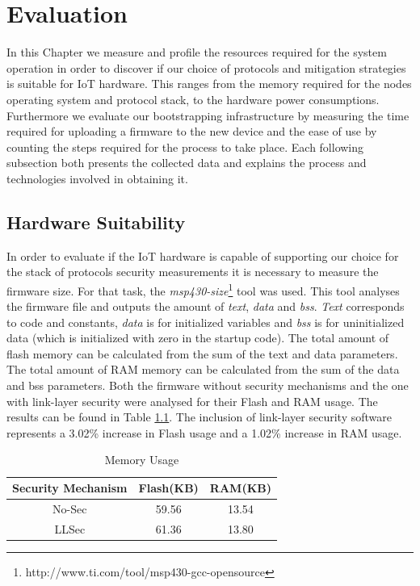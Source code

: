 
\chapter{Evaluation}
\label{chapter:evaluation}

In this Chapter we measure and profile the resources required for the system operation in order to discover if our choice of protocols and mitigation strategies is suitable for \gls{IoT} hardware. 
This ranges from the memory required for the nodes operating system and protocol stack, to the hardware power consumptions. 
Furthermore we evaluate our bootstrapping infrastructure by measuring the time required for uploading a firmware to the new device and the ease of use by counting the steps required for the process to take place. 
Each following subsection both presents the collected data and explains the process and technologies involved in obtaining it.

\section{Hardware Suitability}
In order to evaluate if the \gls{IoT} hardware is capable of supporting our choice for the stack of protocols security measurements it is necessary to measure the firmware size. 
For that task, the \textit{msp430-size}\footnote{http://www.ti.com/tool/msp430-gcc-opensource} tool was used. 
This tool analyses the firmware file and outputs the amount of \textit{text}, \textit{data} and \textit{bss}.
\textit{Text} corresponds to code and constants, \textit{data} is for initialized variables and \textit{bss} is for uninitialized data (which is initialized with zero in the startup code).
The total amount of flash memory can be calculated from the sum of the text and data parameters.
The total amount of \gls{RAM} memory can be calculated from the sum of the data and bss parameters.
Both the firmware without security mechanisms and the one with link-layer security were analysed for their Flash and RAM usage. 
The results can be found in Table \ref{tab:space_req}. The inclusion of link-layer security software represents a 3.02\% increase in Flash usage and a 1.02\% increase in RAM usage.

\begin{table}
\centering
\caption{Memory Usage}
\label{tab:space_req}
\begin{tabular}{|c|c|c|} \hline
Security Mechanism&Flash(KB)&RAM(KB)\\ \hline
No-Sec& 59.56& 13.54\\ \hline
LLSec& 61.36& 13.80\\ %
\hline\end{tabular}
\end{table}

